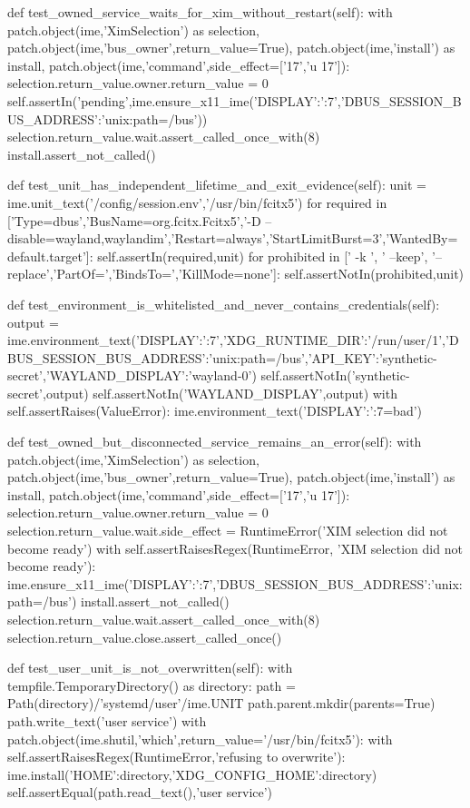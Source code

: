     def test_owned_service_waits_for_xim_without_restart(self):
        with patch.object(ime,'XimSelection') as selection, patch.object(ime,'bus_owner',return_value=True), patch.object(ime,'install') as install, patch.object(ime,'command',side_effect=['17','u 17']):
            selection.return_value.owner.return_value = 0
            self.assertIn('pending',ime.ensure_x11_ime({'DISPLAY':':7','DBUS_SESSION_BUS_ADDRESS':'unix:path=/bus'}))
            selection.return_value.wait.assert_called_once_with(8)
            install.assert_not_called()

    def test_unit_has_independent_lifetime_and_exit_evidence(self):
        unit = ime.unit_text('/config/session.env','/usr/bin/fcitx5')
        for required in ['Type=dbus','BusName=org.fcitx.Fcitx5','-D --disable=wayland,waylandim','Restart=always','StartLimitBurst=3','WantedBy=default.target']:
            self.assertIn(required,unit)
        for prohibited in [' -k ', ' --keep', '--replace','PartOf=','BindsTo=','KillMode=none']:
            self.assertNotIn(prohibited,unit)

    def test_environment_is_whitelisted_and_never_contains_credentials(self):
        output = ime.environment_text({'DISPLAY':':7','XDG_RUNTIME_DIR':'/run/user/1','DBUS_SESSION_BUS_ADDRESS':'unix:path=/bus','API_KEY':'synthetic-secret','WAYLAND_DISPLAY':'wayland-0'})
        self.assertNotIn('synthetic-secret',output)
        self.assertNotIn('WAYLAND_DISPLAY',output)
        with self.assertRaises(ValueError):
            ime.environment_text({'DISPLAY':':7\nExecStart=bad'})

    def test_owned_but_disconnected_service_remains_an_error(self):
        with patch.object(ime,'XimSelection') as selection, patch.object(ime,'bus_owner',return_value=True), patch.object(ime,'install') as install, patch.object(ime,'command',side_effect=['17','u 17']):
            selection.return_value.owner.return_value = 0
            selection.return_value.wait.side_effect = RuntimeError('XIM selection did not become ready')
            with self.assertRaisesRegex(RuntimeError, 'XIM selection did not become ready'):
                ime.ensure_x11_ime({'DISPLAY':':7','DBUS_SESSION_BUS_ADDRESS':'unix:path=/bus'})
            install.assert_not_called()
            selection.return_value.wait.assert_called_once_with(8)
            selection.return_value.close.assert_called_once()

    def test_user_unit_is_not_overwritten(self):
        with tempfile.TemporaryDirectory() as directory:
            path = Path(directory)/'systemd/user'/ime.UNIT
            path.parent.mkdir(parents=True)
            path.write_text('user service\n')
            with patch.object(ime.shutil,'which',return_value='/usr/bin/fcitx5'):
                with self.assertRaisesRegex(RuntimeError,'refusing to overwrite'):
                    ime.install({'HOME':directory,'XDG_CONFIG_HOME':directory})
            self.assertEqual(path.read_text(),'user service\n')

